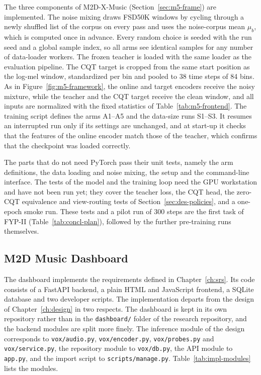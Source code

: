 The three components of M2D-X-Music (Section~\ref{sec:m5-frame}) are implemented. The noise mixing draws FSD50K windows by cycling through a newly shuffled list of the corpus on every pass and uses the noise-corpus mean $\mu_b$, which is computed once in advance. Every random choice is seeded with the run seed and a global sample index, so all arms see identical samples for any number of data-loader workers. The frozen teacher is loaded with the same loader as the evaluation pipeline. The CQT target is cropped from the same start position as the log-mel window, standardized per bin and pooled to 38 time steps of 84 bins. As in Figure~\ref{fig:m5-framework}, the online and target encoders receive the noisy mixture, while the teacher and the CQT target receive the clean window, and all inputs are normalized with the fixed statistics of Table~\ref{tab:m5-frontend}. The training script defines the arms A1--A5 and the data-size runs S1--S3. It resumes an interrupted run only if its settings are unchanged, and at start-up it checks that the features of the online encoder match those of the teacher, which confirms that the checkpoint was loaded correctly.

The parts that do not need PyTorch pass their unit tests, namely the arm definitions, the data loading and noise mixing, the setup and the command-line interface. The tests of the model and the training loop need the GPU workstation and have not been run yet; they cover the teacher loss, the CQT head, the zero-CQT equivalence and view-routing tests of Section~\ref{sec:des-policies}, and a one-epoch smoke run. These tests and a pilot run of 300 steps are the first task of FYP-II (Table~\ref{tab:concl-plan}), followed by the further pre-training runs themselves.

\subsection{M2D Music Dashboard}
\label{sec:impl-dash}
The dashboard implements the requirements defined in Chapter~\ref{ch:srs}. Its code consists of a FastAPI backend, a plain HTML and JavaScript frontend, a SQLite database and two developer scripts. The implementation departs from the design of Chapter~\ref{ch:design} in two respects. The dashboard is kept in its own repository rather than in the \texttt{dashboard/} folder of the research repository, and the backend modules are split more finely. The inference module of the design corresponds to \texttt{vox/audio.py}, \texttt{vox/encoder.py}, \texttt{vox/probes.py} and \texttt{vox/service.py}, the repository module to \texttt{vox/db.py}, the API module to \texttt{app.py}, and the import script to \texttt{scripts/manage.py}. Table~\ref{tab:impl-modules} lists the modules.

